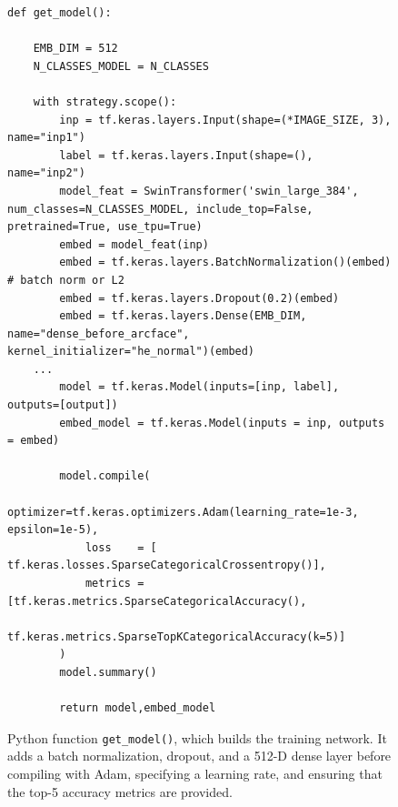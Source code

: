 \documentclass[twocolumn]{article}
\begin{document}
\begin{figure}[H]
\begin{minipage}{1.05\linewidth}
\begin{lstlisting}
def get_model():

    EMB_DIM = 512
    N_CLASSES_MODEL = N_CLASSES

    with strategy.scope():
        inp = tf.keras.layers.Input(shape=(*IMAGE_SIZE, 3), name="inp1")
        label = tf.keras.layers.Input(shape=(), name="inp2")
        model_feat = SwinTransformer('swin_large_384', num_classes=N_CLASSES_MODEL, include_top=False, pretrained=True, use_tpu=True)
        embed = model_feat(inp)
        embed = tf.keras.layers.BatchNormalization()(embed) # batch norm or L2
        embed = tf.keras.layers.Dropout(0.2)(embed)
        embed = tf.keras.layers.Dense(EMB_DIM, name="dense_before_arcface", kernel_initializer="he_normal")(embed)
    ...
        model = tf.keras.Model(inputs=[inp, label], outputs=[output])
        embed_model = tf.keras.Model(inputs = inp, outputs = embed)

        model.compile(
            optimizer=tf.keras.optimizers.Adam(learning_rate=1e-3, epsilon=1e-5),
            loss    = [ tf.keras.losses.SparseCategoricalCrossentropy()],
            metrics = [tf.keras.metrics.SparseCategoricalAccuracy(),
                       tf.keras.metrics.SparseTopKCategoricalAccuracy(k=5)]
        )
        model.summary()
        
        return model,embed_model
\end{lstlisting}
\end{minipage}
\caption{Python function \texttt{get\_model()}, which builds the training network. It adds a batch normalization, dropout, and a 512-D dense layer before compiling with Adam, specifying a learning rate, and ensuring that the top-5 accuracy metrics are provided.}
\end{figure}
\end{document}
